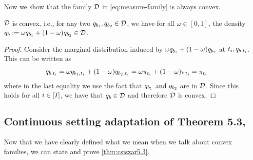 Now we show that the family $\mathcal{D}$ in \cref{eq:measure-family} is always convex.
\begin{myLemma}
\label{lemma:convexD}
$\mathcal{D}$ is convex, i.e.,  for any two $\bridge_{\modeldrift_1},\bridge_{\modeldrift_2}\in \measurefamily$, we have for all $\omega\in [0,1]$, the density $\bridge_{\modeldrift}:=\omega\bridge_{\modeldrift_1} + (1-\omega)\bridge_{\modeldrift_2}\in \measurefamily$.
\end{myLemma}
\begin{proof}
    Consider the marginal distribution induced by $\omega\bridge_{\modeldrift_1} + (1-\omega)\bridge_{\modeldrift_2}$ at $\timestep{\timeidx}, \bridge_{\modeldrift, \timestep{\timeidx}}$. This can be written as
    $$
    \bridge_{\modeldrift, \timestep{\timeidx}}=\omega\bridge_{\modeldrift_1,\timestep{\timeidx}} + (1-\omega)\bridge_{\modeldrift_2,\timestep{\timeidx}} = \omega\marginal{\timestep{\timeidx}}+(1-\omega)\marginal{\timestep{\timeidx}} = \marginal{\timestep{\timeidx}}
    $$
    where in the last equality we use the fact that $\bridge_{\modeldrift_1}$ and $\bridge_{\modeldrift_2}$ are in $\mathcal{D}$. Since this holds for all $i\in[I]$, we have that $\bridge_{\modeldrift}\in \measurefamily$ and therefore $\mathcal{D}$ is convex.
\end{proof}

\subsection{Continuous setting adaptation of Theorem 5.3, \texorpdfstring{\citet{csiszar2004information}}{}}

Now that we have clearly defined what we mean when we talk about convex families, we can state and prove \cref{thm:csiszar5.3}.

